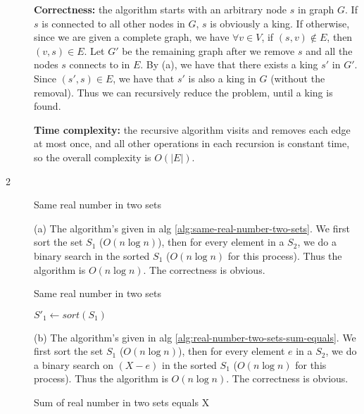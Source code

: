 \documentclass{article}
\begin{document}
\begin{description}
  \textbf{Correctness:} the algorithm starts with an arbitrary node $s$ in graph $G$. If $s$ is connected to all other nodes in $G$, $s$ is obviously a king. If otherwise, since we are given a complete graph, we have $\forall v \in V$, if $(s,v) \notin E$, then $(v,s) \in E$. Let $G'$ be the remaining graph after we remove $s$ and all the nodes $s$ connects to in $E$. By (a), we have that there exists a king $s'$ in $G'$. Since $(s', s) \in E$, we have that $s'$ is also a king in $G$ (without the removal). Thus we can recursively reduce the problem, until a king is found.

  \textbf{Time complexity:} the recursive algorithm visits and removes each edge at most once, and all other operations in each recursion is constant time, so the overall complexity is $O(|E|)$.
  
\item[2]{Same real number in two sets}
  
  (a) The algorithm's given in alg \ref{alg:same-real-number-two-sets}. We first sort the set $S_1$ ($O(n \log n)$), then for every element in a $S_2$, we do a binary search in the sorted $S_1$ ($O(n \log n)$ for this process). Thus the algorithm is $O(n \log n)$. The correctness is obvious.

  \begin{algorithm}[H]
  \caption{Same real number in two sets}
  \label{alg:same-real-number-two-sets}
    \begin{algorithmic}[1]
    
      \State $S'_1 \gets sort(S_1)$
          \State {}
        \EndIf
      \EndFor
      \State {}
    \EndFunction

    \end{algorithmic}
  \end{algorithm}

  (b) The algorithm's given in alg \ref{alg:real-number-two-sets-sum-equals}. We first sort the set $S_1$ ($O(n \log n)$), then for every element $e$ in a $S_2$, we do a binary search on $(X - e)$ in the sorted $S_1$ ($O(n \log n)$ for this process). Thus the algorithm is $O(n \log n)$. The correctness is obvious.

  \begin{algorithm}[H]
  \caption{Sum of real number in two sets equals X}
  \label{alg:real-number-two-sets-sum-equals}
    \begin{algorithmic}[1]
    

\end{algorithmic}
\end{algorithm}
\end{description}
\end{document}
